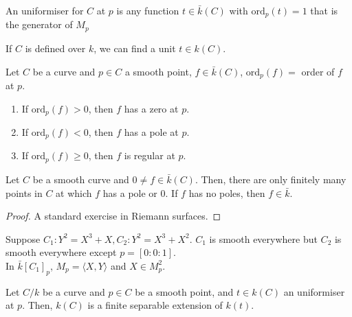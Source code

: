 \documentclass[oneside, 12pt]{scrbook}
\newcommand{\ord}{\mathrm{ord}}
\theoremstyle{theorem}
\begin{document}
\begin{definition}
An uniformiser for $C$ at $p$ is any function $t \in \bar{k}(C)$ with $\mathrm{ord}_{p}(t) = 1$ that is the generator of $M_{p}$
\end{definition}

\begin{remark}
If $C$ is defined over $k$, we can find a unit $t \in k(C)$.
\end{remark}

\begin{definition}
Let $C$ be a curve and $p \in C$ a smooth point, $f \in \bar{k}(C)$, $\ord_{p}(f) =$ order of $f$ at $p$.

\begin{enumerate}
\item If $\ord_{p}(f)> 0$, then $f$ has a zero at $p$.
\item If $\ord_{p}(f)< 0$, then $f$ has a pole at $p$.
\item If $\ord_{p}(f)\geq 0$, then $f$ is regular at $p$.
\end{enumerate}
\end{definition}

\begin{proposition}
Let $C$ be a smooth curve and $0 \neq f \in \bar{k}(C)$. Then, there are only finitely many points in $C$ at which $f$ has a pole or $0$. If $f$ has no poles, then $f\in \bar{k}$.
\end{proposition}

\begin{proof}
A standard exercise in Riemann surfaces.
\end{proof}

\begin{example}
Suppose $C_{1}: Y^2 = X^3 + X , C_{2}: Y^2 = X^3 + X^2$. $C_{1}$ is smooth everywhere but $C_{2}$ is smooth everywhere except $p = [0:0:1]$.\\

In $\bar{k}[C_{1}]_{p}$, $M_{p} = \langle X,Y \rangle$ and $X \in M_{p}^2$.
\end{example}

\begin{proposition}
Let $C/k$ be a curve and $p \in C$ be a smooth point, and $t \in k(C)$ an uniformiser at $p$. Then, $k(C)$ is a finite separable extension of $k(t)$.
\end{proposition}
\end{document}
